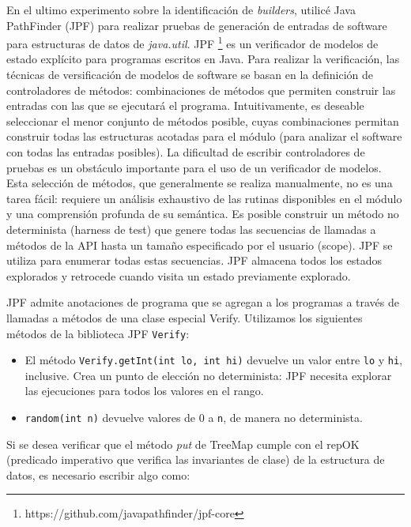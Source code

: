 En el ultimo experimento sobre la identificación de \emph{builders}, utilicé Java PathFinder \cite{Visser:2005} (JPF) para realizar pruebas de generación de entradas de software para estructuras de datos de \emph{java.util}. JPF \footnote{https://github.com/javapathfinder/jpf-core}  es un verificador de modelos de estado explícito para programas escritos en Java. Para realizar la verificación, las técnicas de versificación de modelos de software se basan en la definición de controladores de métodos: combinaciones de métodos que permiten construir las entradas con las que se ejecutará el programa. Intuitivamente, es deseable seleccionar el menor conjunto de métodos posible, cuyas combinaciones permitan construir todas las estructuras acotadas para el módulo (para analizar el software con todas las entradas posibles). La dificultad de escribir controladores de pruebas es un obstáculo importante para el uso de un verificador de modelos. Esta selección de métodos, que generalmente se realiza manualmente, no es una tarea fácil: requiere un análisis exhaustivo de las rutinas disponibles en el módulo y una comprensión profunda de su semántica.
Es posible construir un método no determinista (harness de test) que genere todas las secuencias de llamadas a métodos de la API hasta un tamaño especificado por el usuario (scope). JPF se utiliza para enumerar todas estas secuencias. JPF almacena todos los estados explorados y retrocede cuando visita un estado previamente explorado.

JPF admite anotaciones de programa que se agregan a los programas a través de llamadas a métodos de una clase especial Verify.
Utilizamos los siguientes métodos de la biblioteca JPF \verb"Verify":
\\
\begin{itemize}
\item El método \verb"Verify.getInt(int lo, int hi)" devuelve un valor entre \verb"lo" y \verb"hi", inclusive. Crea un punto de elección no determinista: JPF necesita explorar las ejecuciones para todos los valores en el rango.
\item \verb"random(int n)" devuelve valores de 0 a \verb"n", de manera no determinista.
\end{itemize}

Si se desea verificar que el método \emph{put}  de TreeMap cumple con el repOK (predicado imperativo que verifica las invariantes de clase) de la estructura de datos, es necesario escribir algo como: 
\\

